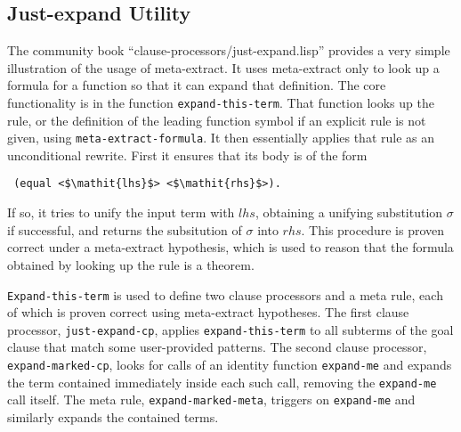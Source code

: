 

\begin{comment}
  I was thinking of this as some examples readers could look at to
  show how meta-extract is used in practice, but now that we have the
  examples from the previous section maybe that shouldn't be the
  focus.  Instead, maybe we really want to say what the most important
  uses of it so far have been, and just show that it really is useful
  in building sophisticated tools.  So, de-emphasize the just-expand
  utility and spend a bit more time on GL?
\end{comment}

\subsection{Just-expand Utility}

The community book ``clause-processors/just-expand.lisp'' provides a
very simple illustration of the usage of meta-extract.  It uses
meta-extract only to look up a formula for a function so that it can
expand that definition.  The core functionality is in the function
\texttt{expand-this-term}.  That function looks up the rule, or the
definition of the leading function symbol if an explicit rule is not
given, using \texttt{meta-extract-formula}.  It then essentially
applies that rule as an unconditional rewrite.  First it ensures that
its body is of the form
\begin{lstlisting}
 (equal <$\mathit{lhs}$> <$\mathit{rhs}$>).
\end{lstlisting}
If so, it tries to unify the input term with $\mathit{lhs}$, obtaining
a unifying substitution $\sigma$ if successful, and returns the
subsitution of $\sigma$ into $\mathit{rhs}$.  This procedure is proven
correct under a meta-extract hypothesis, which is used to reason that
the formula obtained by looking up the rule is a theorem.

\texttt{Expand-this-term} is used to define two clause processors and
a meta rule, each of which is proven correct using meta-extract
hypotheses.  The first clause processor, \texttt{just-expand-cp},
applies \texttt{expand-this-term} to all subterms of the goal clause
that match some user-provided patterns.  The second clause processor,
\texttt{expand-marked-cp}, looks for calls of an identity function
\texttt{expand-me} and expands the term contained immediately inside
each such call, removing the \texttt{expand-me} call itself.  The meta
rule, \texttt{expand-marked-meta}, triggers on \texttt{expand-me} and
similarly expands the contained terms.

